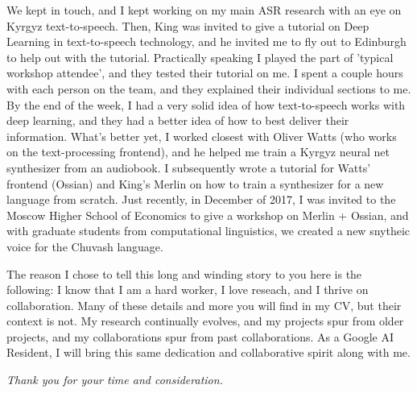\documentclass[12pt,a4paper]{article}
\begin{document}
We kept in touch, and I kept working on my main ASR research with an eye on Kyrgyz text-to-speech. Then, King was invited to give a tutorial on Deep Learning in text-to-speech technology, and he invited me to fly out to Edinburgh to help out with the tutorial. Practically speaking I played the part of 'typical workshop attendee', and they tested their tutorial on me. I spent a couple hours with each person on the team, and they explained their individual sections to me. By the end of the week, I had a very solid idea of how text-to-speech works with deep learning, and they had a better idea of how to best deliver their information. What's better yet, I worked closest with Oliver Watts (who works on the text-processing frontend), and he helped me train a Kyrgyz neural net synthesizer from an audiobook. I subsequently wrote a tutorial for Watts' frontend (Ossian) and King's Merlin on how to train a synthesizer for a new language from scratch. Just recently, in December of 2017, I was invited to the Moscow Higher School of Economics to give a workshop on Merlin + Ossian, and with graduate students from computational linguistics, we created a new snytheic voice for the Chuvash language.

The reason I chose to tell this long and winding story to you here is the following: I know that I am a hard worker, I love reseach, and I thrive on collaboration. Many of these details and more you will find in my CV, but their context is not. My research continually evolves, and my projects spur from older projects, and my collaborations spur from past collaborations. As a Google AI Resident, I will bring this same dedication and collaborative spirit along with me.






\begin{center}
\textit{Thank you for your time and consideration.}  
\end{center}
\end{document}

